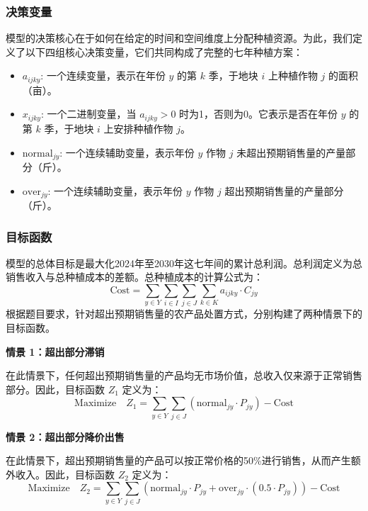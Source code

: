 \subsubsection{决策变量}

模型的决策核心在于如何在给定的时间和空间维度上分配种植资源。为此，我们定义了以下四组核心决策变量，它们共同构成了完整的七年种植方案：
\begin{itemize}
	\item $a_{ijky}$: 一个连续变量，表示在年份 $y$ 的第 $k$ 季，于地块 $i$ 上种植作物 $j$ 的面积（亩）。
	\item $x_{ijky}$: 一个二进制变量，当 $a_{ijky} > 0$ 时为1，否则为0。它表示是否在年份 $y$ 的第 $k$ 季，于地块 $i$ 上安排种植作物 $j$。
	\item $\text{normal}_{jy}$: 一个连续辅助变量，表示年份 $y$ 作物 $j$ 未超出预期销售量的产量部分（斤）。
	\item $\text{over}_{jy}$: 一个连续辅助变量，表示年份 $y$ 作物 $j$ 超出预期销售量的产量部分（斤）。
\end{itemize}



\subsubsection{目标函数}

模型的总体目标是最大化2024年至2030年这七年间的累计总利润。总利润定义为总销售收入与总种植成本的差额。总种植成本的计算公式为：
\begin{equation}
	\text{Cost} = \sum_{y \in Y} \sum_{i \in I} \sum_{j \in J} \sum_{k \in K} a_{ijky} \cdot C_{jy}
\end{equation}
根据题目要求，针对超出预期销售量的农产品处置方式，分别构建了两种情景下的目标函数。

\textbf{情景 1：超出部分滞销}

在此情景下，任何超出预期销售量的产品均无市场价值，总收入仅来源于正常销售部分。因此，目标函数 $Z_1$ 定义为：
\begin{equation}
	\text{Maximize} \quad Z_1 = \sum_{y \in Y} \sum_{j \in J} (\text{normal}_{jy} \cdot P_{jy}) - \text{Cost}
\end{equation}

\textbf{情景 2：超出部分降价出售}

在此情景下，超出预期销售量的产品可以按正常价格的50\%进行销售，从而产生额外收入。因此，目标函数 $Z_2$ 定义为：
\begin{equation}
	\text{Maximize} \quad Z_2 = \sum_{y \in Y} \sum_{j \in J} (\text{normal}_{jy} \cdot P_{jy} + \text{over}_{jy} \cdot (0.5 \cdot P_{jy})) - \text{Cost}
\end{equation}

